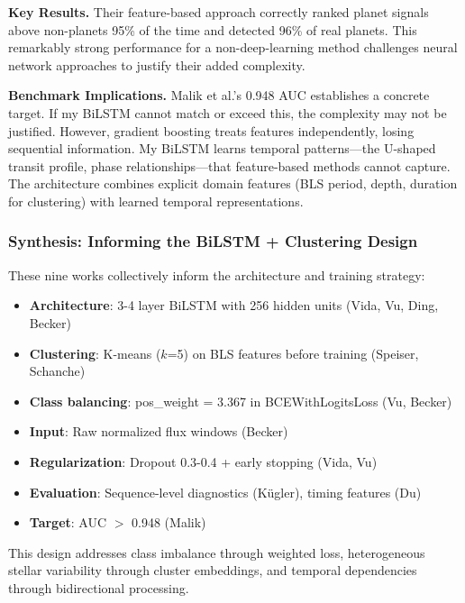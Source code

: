 \textbf{Key Results.} Their feature-based approach correctly ranked planet signals above non-planets 95\% of the time and detected 96\% of real planets. This remarkably strong performance for a non-deep-learning method challenges neural network approaches to justify their added complexity.

\textbf{Benchmark Implications.} Malik et al.'s 0.948 AUC establishes a concrete target. If my BiLSTM cannot match or exceed this, the complexity may not be justified. However, gradient boosting treats features independently, losing sequential information. My BiLSTM learns temporal patterns---the U-shaped transit profile, phase relationships---that feature-based methods cannot capture. The architecture combines explicit domain features (BLS period, depth, duration for clustering) with learned temporal representations.

\subsubsection{Synthesis: Informing the BiLSTM + Clustering Design}

These nine works collectively inform the architecture and training strategy:

\begin{itemize}
    \item \textbf{Architecture}: 3-4 layer BiLSTM with 256 hidden units (Vida, Vu, Ding, Becker)
    \item \textbf{Clustering}: K-means ($k$=5) on BLS features before training (Speiser, Schanche)
    \item \textbf{Class balancing}: pos\_weight = 3.367 in BCEWithLogitsLoss (Vu, Becker)
    \item \textbf{Input}: Raw normalized flux windows (Becker)
    \item \textbf{Regularization}: Dropout 0.3-0.4 + early stopping (Vida, Vu)
    \item \textbf{Evaluation}: Sequence-level diagnostics (K\"ugler), timing features (Du)
    \item \textbf{Target}: AUC $>$ 0.948 (Malik)
\end{itemize}

This design addresses class imbalance through weighted loss, heterogeneous stellar variability through cluster embeddings, and temporal dependencies through bidirectional processing.
